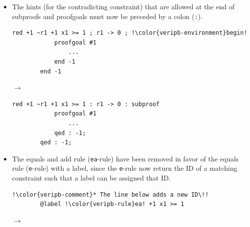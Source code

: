 \documentclass[a4paper]{article}
\newcommand{\veriPB}[0]{\textsc{VeriPB}}
\begin{document}
\begin{itemize}
\begin{minipage}{.47\linewidth}
\begin{lstlisting}[language=veripb, gobble=8, rulecolor=\color{veripb-valid-text}, caption={\veriPB{} 3.0 syntax.}]
		qed;
		\end{lstlisting}
	      \end{minipage}
	\item The hints (for the contradicting constraint) that are allowed at the end of subproofs and proofgoals must now be preceded by a colon (\verb!:!).
	      \\[1mm]
	      \begin{minipage}{.47\linewidth}
		      \begin{lstlisting}[language=veripb, gobble=8, rulecolor=\color{veripb-invalid-text}, caption={\veriPB{} 2.0 syntax.}]
		red +1 ~r1 +1 x1 >= 1 ; r1 -> 0 ; !\color{veripb-environment}begin!
			proofgoal #1
				...
			end -1
		end -1
		\end{lstlisting}
	      \end{minipage}\hfill%
	      \begin{minipage}[t]{.05\linewidth}
		      \centering \vspace*{-5mm}$\to$
	      \end{minipage}\hfill%
	      \hfill%
	      \begin{minipage}{.47\linewidth}
		      \begin{lstlisting}[language=veripb, gobble=8, rulecolor=\color{veripb-valid-text}, caption={\veriPB{} 3.0 syntax.}]
		red +1 ~r1 +1 x1 >= 1 : r1 -> 0 : subproof
			proofgoal #1
				...
			qed : -1;
		qed : -1;
		\end{lstlisting}
	      \end{minipage}
	\item The equals and add rule (\verb!ea!-rule) have been removed in favor of the equals rule (\verb!e!-rule) with a label, since the \verb!e!-rule now return the ID of a matching constraint such that a label can be assigned that ID.
	      \\[1mm]
	      \begin{minipage}{.47\linewidth}
		      \begin{lstlisting}[language=veripb, gobble=8, rulecolor=\color{veripb-invalid-text}, caption={\veriPB{} 2.0 syntax.}]
		!\color{veripb-comment}* The line below adds a new ID\!!
		@label !\color{veripb-rule}ea! +1 x1 >= 1
		\end{lstlisting}
	      \end{minipage}\hfill%
	      \begin{minipage}[t]{.05\linewidth}
		      \centering \vspace*{-5mm}$\to$
	      \end{minipage}\hfill%
	      \hfill%

\end{itemize}
\end{document}
